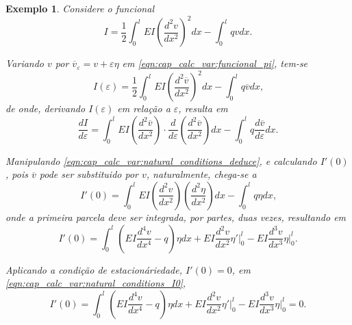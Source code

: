 \documentclass[
	12pt,				%
	openright,			%
    twoside,			%
	a4paper,			%
	english,			%
	french,				%
	spanish,			%
	brazil				%
	]{abntex2}
\newtheorem{exemplo}{Exemplo}
\numberwithin{lema}{chapter}
\numberwithin{teorema}{chapter}
\numberwithin{definicao}{chapter}
\numberwithin{exemplo}{chapter}
\numberwithin{figure}{chapter}
\begin{document}
\begin{exemplo}
	Considere o funcional
	\begin{equation}
		\label{eqn:cap_calc_var:funcional_pi}
		I = \frac{1}{2}	\int_{0}^{l}
			EI \left (
				\frac{d^2v}{dx^2}
			\right )^2 dx
			-
			\int_{0}^{l} qv dx
			\text{.}
	\end{equation}
	
	Variando $v$ por $\overline{v}_{\varepsilon}=v+\varepsilon \eta$ em \eqref{eqn:cap_calc_var:funcional_pi}, tem-se
	$$
		I(\varepsilon) = \frac{1}{2} \int_{0}^{l}
			EI \left (
				\frac{d^2\overline{v}}{dx^2}
			\right )^2 dx
			-
			\int_{0}^{l} q\overline{v} dx
			\text{,}
	$$
	de onde, derivando $I(\varepsilon)$ em relação a $\varepsilon$, resulta em
	\begin{equation}
		\label{eqn:cap_calc_var:natural_conditions_deduce}
		\frac{dI}{d\varepsilon} = 
			\int_{0}^{l} EI \left (
				\frac{d^2\overline{v}}{dx^2}
			\right ) \cdot 
			\frac{d}{d\varepsilon}\left (
				\frac{d^2\overline{v}}{dx^2}
			\right ) dx
			-
			\int_{0}^{l} q\frac{d\overline{v}}{d\varepsilon} dx
			\text{.}
	\end{equation}
	
	Manipulando \eqref{eqn:cap_calc_var:natural_conditions_deduce}, e calculando $I'(0)$, pois $\overline{v}$ pode ser substituido por $v$, naturalmente, chega-se a
	$$
		I'(0) = 
			\int_{0}^{l} EI \left (
				\frac{d^2v}{dx^2}
			\right ) \left (
				\frac{d^2\eta}{dx^2}
			\right ) dx
			-
			\int_{0}^{l}q\eta dx
		\text{,}
	$$
	onde a primeira parcela deve ser integrada, por partes, duas vezes, resultando em
	\begin{equation}
		\label{eqn:cap_calc_var:natural_conditions_I0}
		I'(0) = 
			\int_{0}^{l} \left (
				EI\frac{d^4 v}{dx^4}-q 
			\right ) \eta dx
			+
			EI\frac{d^2 v}{dx^2} \eta' \Big |_{0}^{l}
			-
			EI\frac{d^3 v}{dx^3} \eta \Big |_{0}^{l}
			\text{.}
	\end{equation}
	
	Aplicando a condição de estacionáriedade, $I'(0)=0$, em \eqref{eqn:cap_calc_var:natural_conditions_I0},
	\begin{equation}
		\label{eqn:cap_calc_var:natural_conditions_I0_eq_0}
		I'(0) = 
			\int_{0}^{l} \left (
				EI\frac{d^4 v}{dx^4}-q 
			\right ) \eta dx
			+
			EI\frac{d^2 v}{dx^2} \eta ' \Big |_{0}^{l}
			-
			EI\frac{d^3 v}{dx^3} \eta \Big |_{0}^{l}
			= 0
			\text{.}
	\end{equation}
	

\end{exemplo}
\end{document}
